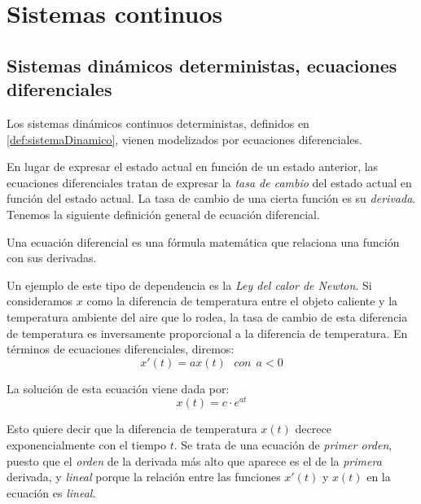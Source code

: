 \section{Sistemas continuos}

\subsection{Sistemas dinámicos deterministas, ecuaciones diferenciales}

Los sistemas dinámicos continuos deterministas, definidos en \ref{def:sistemaDinamico}, vienen modelizados por ecuaciones diferenciales.

En lugar de expresar el estado actual en función de un estado anterior, las ecuaciones diferenciales tratan de expresar la \emph{tasa de cambio} del estado actual en función del estado actual. La tasa de cambio de una cierta función es su \emph{derivada}. Tenemos la siguiente definición general de ecuación diferencial.

\begin{definition}
Una ecuación diferencial es una fórmula matemática que relaciona una función con sus derivadas.
\end{definition}

\begin{example}\label{ex:calor}
Un ejemplo de este tipo de dependencia es la \emph{Ley del calor de Newton}. Si consideramos $x$ como la diferencia de temperatura entre el objeto caliente y la temperatura ambiente del aire que lo rodea, la tasa de cambio de esta diferencia de temperatura es inversamente proporcional a la diferencia de temperatura. En términos de ecuaciones diferenciales, diremos:
\begin{equation}
x'(t) = ax(t)~~~con~~ a<0
\end{equation}

La solución de esta ecuación viene dada por:
\begin{equation}
x(t) = c\cdot e^{at}
\end{equation}

Esto quiere decir que la diferencia de temperatura $x(t)$ decrece exponencialmente con el tiempo $t$. Se trata de una ecuación  de \emph{primer orden}, puesto que el \emph{orden} de la derivada más alto que aparece es el de la \emph{primera} derivada, y \emph{lineal} porque la relación entre las funciones $x'(t)$ y $x(t)$ en la ecuación es \emph{lineal}.
\end{example}


